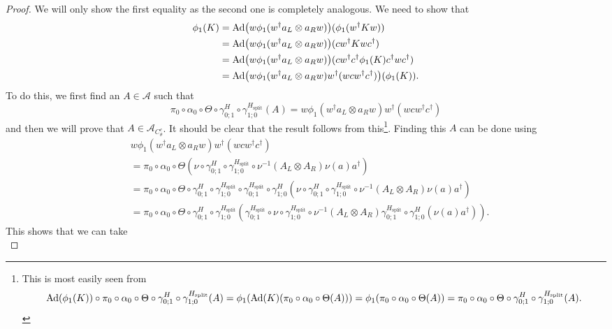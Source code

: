 \documentclass[12pt,a4paper,twoside]{article}
\let\originalleft\left
\let\originalright\right
\renewcommand{\left}{\mathopen{}\mathclose\bgroup\originalleft}
\renewcommand{\right}{\aftergroup\egroup\originalright}
\renewcommand{\AA}{\mathcal A}
\newcommand{\Ad}[1]{\textrm{Ad}\left(#1\right)}
\theoremstyle{definition}
\numberwithin{equation}{section}
\begin{document}
\begin{proof}
	We will only show the first equality as the second one is completely analogous. We need to show that
	\begin{align}
		\phi_1(K)&=\Ad{w\phi_1(w^\dagger a_L\otimes a_R w)}(\phi_1(w^\dagger K w))\\
		&=\Ad{w\phi_1(w^\dagger a_L\otimes a_R w)}(cw^\dagger K wc^\dagger)\\
		&=\Ad{w\phi_1(w^\dagger a_L\otimes a_R w)}(cw^\dagger c^\dagger \phi_1(K) c^\dagger wc^\dagger)\\
		&=\Ad{w\phi_1(w^\dagger a_L\otimes a_R w)w^\dagger (w cw^\dagger c^\dagger)}(\phi_1(K)).
	\end{align}
	To do this, we first find an $A\in\AA$ such that
	\begin{equation}
		\pi_0\circ\alpha_0\circ\Theta\circ\gamma^H_{0;1}\circ\gamma^{H_\text{split}}_{1;0}(A)=w\phi_1(w^\dagger a_L\otimes a_R w)w^\dagger (w cw^\dagger c^\dagger)
	\end{equation}
	and then we will prove that $A\in\AA_{C_\theta^c}$. It should be clear that the result follows from this\footnote{This is most easily seen from\begin{equation}
			\Ad{\phi_1(K)}\circ\pi_0\circ\alpha_0\circ\Theta\circ\gamma^H_{0;1}\circ\gamma^{H_\text{split}}_{1;0}(A)=\phi_1(\Ad{K}(\pi_0\circ\alpha_0\circ\Theta(A)))=\phi_1(\pi_0\circ\alpha_0\circ\Theta(A))=\pi_0\circ\alpha_0\circ\Theta\circ\gamma^H_{0;1}\circ\gamma^{H_\text{split}}_{1;0}(A).
	\end{equation}}. Finding this $A$ can be done using
	\begin{align}
		&w\phi_1(w^\dagger a_L\otimes a_R w)w^\dagger (w cw^\dagger c^\dagger)\\
		&=\pi_0\circ\alpha_0\circ\Theta(\nu\circ\gamma^H_{0;1}\circ\gamma^{H_\text{split}}_{1;0}\circ\nu^{-1}(A_L\otimes A_R)\nu(a)a^\dagger)\\
		&=\pi_0\circ\alpha_0\circ\Theta\circ\gamma^H_{0;1}\circ\gamma^{H_\text{split}}_{1;0}\circ\gamma^{H_\text{split}}_{0;1}\circ\gamma^H_{1;0}(\nu\circ\gamma^H_{0;1}\circ\gamma^{H_\text{split}}_{1;0}\circ\nu^{-1}(A_L\otimes A_R)\nu(a)a^\dagger)\\
		&=\pi_0\circ\alpha_0\circ\Theta\circ\gamma^H_{0;1}\circ\gamma^{H_\text{split}}_{1;0}(\gamma^{H_\text{split}}_{0;1}\circ\nu\circ\gamma^{H_\text{split}}_{1;0}\circ\nu^{-1}(A_L\otimes A_R)\gamma^{H_\text{split}}_{0;1}\circ\gamma^H_{1;0}(\nu(a)a^\dagger)).
	\end{align}
	This shows that we can take
	\begin{equation}

\end{equation}
\end{proof}
\end{document}
